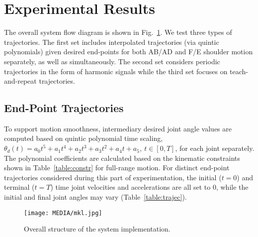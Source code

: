 \documentclass[letterpaper, 10pt, conference]{ieeeconf}      %
\begin{document}


\section{Experimental Results}
\label{sec:experim}


The overall system flow diagram is shown in Fig.~\ref{fig:overall}. %
We test three types of trajectories. The first set includes interpolated trajectories (via quintic polynomials) given desired end-points for both AB/AD and F/E shoulder motion separately, as well as simultaneously. The second set considers periodic trajectories in the form of harmonic signals while the third set focuses on teach-and-repeat trajectories. 

\subsection{End-Point Trajectories}

To support motion smoothness, intermediary desired joint angle values are computed based on quintic polynomial time scaling, $\theta_d(t) = a_0t^5+a_1t^4+a_2t^3+a_3t^2+a_4t+a_5,~t\in[0,T]$, for each joint separately. The polynomial coefficients are calculated based on the kinematic constraints shown in Table~\ref{table:constr} for full-range motion. For distinct end-point trajectories considered during this part of experimentation, the initial ($t=0$) and terminal ($t=T$) time joint velocities and accelerations are all set to 0, while the initial and final joint angles may vary (Table~\ref{table:trajec}). 

\begin{figure}[!t]
\vspace{3pt}
\texttt{[image: MEDIA/mkl.jpg]}
\vspace{-21pt}
\caption{Overall structure of the system implementation.}
\label{fig:overall}
\vspace{-3pt}
\end{figure}
\end{document}
